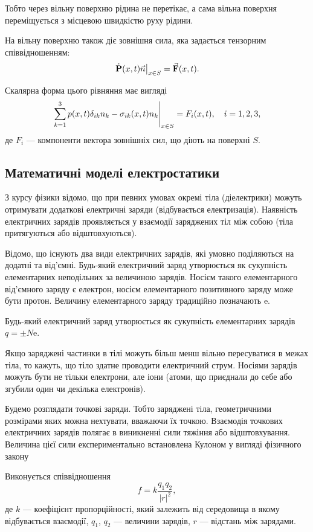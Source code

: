 \begin{remark}
	Тобто через вільну поверхню рідина не перетікає, а сама вільна поверхня переміщується з місцевою швидкістю руху рідини.
\end{remark}

На вільну поверхню також діє зовнішня сила, яка задається тензорним співвідношенням:
\begin{equation}
	\left. \dot{\textbf{P}}(x, t) \vec n \right|_{x \in S} = {\vec{\mathbf{F}}}(x, t).
\end{equation}

Скалярна форма цього рівняння має вигляді
\begin{equation}
	\left. \displaystyle\sum\limits_{k = 1}^3 p(x, t) \delta_{ik} n_k - \sigma_{ik}(x, t) n_k \right|_{x \in S} = F_i(x, t), \quad i = 1, 2, 3,
\end{equation}
де $F_i$ --- компоненти вектора зовнішніх сил, що діють на поверхні $S$.

\subsection{Математичні моделі електростатики}

З курсу фізики відомо, що при певних умовах окремі тіла (діелектрики) можуть отримувати додаткові електричні заряди (відбувається електризація). Наявність електричних зарядів проявляється у взаємодії заряджених тіл між собою (тіла притягуються або відштовхуються). \medskip

Відомо, що існують два види електричних зарядів, які умовно поділяються на додатні та від'ємні. Будь-який електричний заряд утворюється як сукупність елементарних неподільних за величиною зарядів. Носієм такого елементарного від'ємного заряду є електрон, носієм елементарного позитивного заряду може бути протон. Величину елементарного заряду традиційно позначають $\mathrm{e}$. \medskip

Будь-який електричний заряд утворюється як сукупність елементарних зарядів $q = \pm N \mathrm{e}$. \medskip

Якщо заряджені частинки в тілі можуть більш менш вільно пересуватися в межах тіла, то кажуть, що тіло здатне проводити електричний струм. Носіями зарядів можуть бути не тільки електрони, але іони (атоми, що приєднали до себе або згубили один чи декілька електронів). \medskip

Будемо розглядати точкові заряди. Тобто заряджені тіла, геометричними розмірами яких можна нехтувати, вважаючи їх точкою. Взаємодія точкових електричних зарядів полягає в виникненні сили тяжіння або відштовхування. Величина цієї сили експериментально встановлена Кулоном у вигляді фізичного закону
\begin{law}[Кулона]
	Виконується співвідношення
	\begin{equation}
		f = k \frac{q_1 q_2}{|r|^2},
	\end{equation}
	де  $k$ --- коефіцієнт пропорційності, який залежить від середовища в якому відбувається взаємодії, $q_1$, $q_2$ --- величини зарядів, $r$ --- відстань між зарядами.
\end{law}

